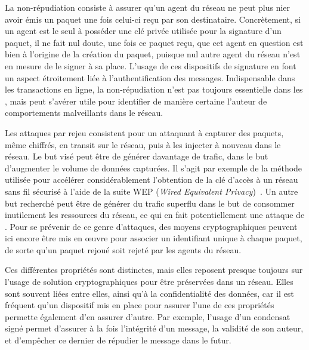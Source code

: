 La non-répudiation consiste à assurer qu'un agent du réseau ne peut plus nier avoir émis un paquet une fois celui-ci reçu par son destinataire.
Concrètement, si un agent est le seul à posséder une clé privée utilisée pour la signature d'un paquet, il ne fait nul doute, une fois ce paquet reçu, que cet agent en question est bien à l'origine de la création du paquet, puisque nul autre agent du réseau n'est en mesure de le signer à sa place.
L'usage de ces dispositifs de signature en font un aspect étroitement liée à l'authentification des messages.
Indispensable dans les transactions en ligne, la non-répudiation n'est pas toujours essentielle dans les \rcs, mais peut s'avérer utile pour identifier de manière certaine l'auteur de comportements malveillants dans le réseau.

Les attaques par rejeu consistent pour un attaquant à capturer des paquets, même chiffrés, en transit sur le réseau, puis à les injecter à nouveau dans le réseau.
Le but visé peut être de générer davantage de trafic, dans le but d'augmenter le volume de données capturées.
Il s'agit par exemple de la méthode utilisée pour accélérer considérablement l'obtention de la clé d'accès à un réseau sans fil sécurisé à l'aide de la suite WEP (\textit{Wired Equivalent Privacy})~\cite{BGW01}.
Un autre but recherché peut être de générer du trafic superflu dans le but de consommer inutilement les ressources du réseau, ce qui en fait potentiellement une attaque de \dds.
Pour se prévenir de ce genre d'attaques, des moyens cryptographiques peuvent ici encore être mis en œuvre pour associer un identifiant unique à chaque paquet, de sorte qu'un paquet rejoué soit rejeté par les agents du réseau.

Ces différentes propriétés sont distinctes, mais elles reposent presque toujours sur l'usage de solution cryptographiques pour être préservées dans un réseau.
Elles sont souvent liées entre elles, ainsi qu'à la confidentialité des données, car il est fréquent qu'un dispositif mis en place pour assurer l'une de ces propriétés permette également d'en assurer d'autre.
Par exemple, l'usage d'un condensat signé permet d'assurer à la fois l'intégrité d'un message, la validité de son auteur, et d'empêcher ce dernier de répudier le message dans le futur.

